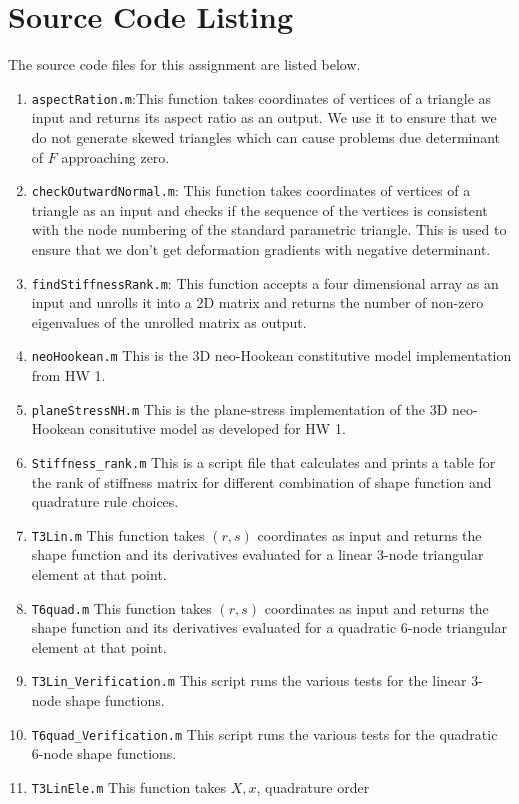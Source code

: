 \documentclass[../main.tex]{subfiles}
\begin{document}
\section{Source Code Listing}
The source code files for this assignment are listed below.
\begin{enumerate}
\item \texttt{aspectRation.m}:This function takes coordinates of
  vertices of a triangle as input and returns its aspect ratio as an
  output. We use it to ensure that we do not generate skewed triangles
  which can cause problems due determinant of $F$ approaching zero.
\item \texttt{checkOutwardNormal.m}: This function takes coordinates
  of vertices of a triangle as an input and checks if the sequence of
  the vertices is consistent with the node numbering of the standard
  parametric triangle. This is used to ensure that we don't get
  deformation gradients with negative determinant.
\item \texttt{findStiffnessRank.m}: This function accepts a four
  dimensional array as an input and unrolls it into a 2D matrix and
  returns the number of non-zero eigenvalues of the unrolled matrix as
  output.
\item \texttt{neoHookean.m} This is the 3D neo-Hookean constitutive
  model implementation from HW 1.
\item \texttt{planeStressNH.m} This is the plane-stress implementation
  of the 3D neo-Hookean consitutive model as developed for HW 1.
\item \texttt{Stiffness\_rank.m} This is a script file that calculates
  and prints a table for the rank of stiffness matrix for different
  combination of shape function and quadrature rule choices.
\item \texttt{T3Lin.m} This function takes $(r,s)$ coordinates as
  input and returns the shape function and its derivatives evaluated
  for a linear 3-node triangular element at that point.
\item \texttt{T6quad.m} This function takes $(r,s)$ coordinates as
  input and returns the shape function and its derivatives evaluated
  for a quadratic 6-node triangular element at that point.
\item \texttt{T3Lin\_Verification.m} This script runs the various tests
  for the linear 3-node shape functions.
\item \texttt{T6quad\_Verification.m} This script runs the various tests
  for the quadratic 6-node shape functions.
\item \texttt{T3LinEle.m} This function takes $X,x$, quadrature order

\end{enumerate}
\end{document}
